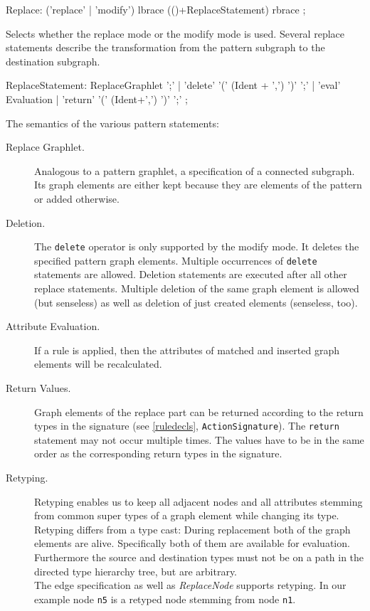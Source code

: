 \begin{rail}
  Replace: ('replace' | 'modify') lbrace (()+ReplaceStatement) rbrace ;
\end{rail}
Selects whether the replace mode or the modify mode is used. Several replace statements describe the transformation from the pattern subgraph to the destination subgraph.

\begin{rail}  
  ReplaceStatement: ReplaceGraphlet ';' |
    'delete' '(' (Ident + ',') ')' ';' |
    'eval' Evaluation |
    'return' '(' (Ident+',') ')' ';' ;
\end{rail}    
The semantics of the various pattern statements:
\begin{description}
  \item[Replace Graphlet.] Analogous to a pattern graphlet, a specification of a connected subgraph. Its graph elements are either kept because they are elements of the pattern or added otherwise.
  \item[Deletion.] The \texttt{delete} operator is only supported by the modify mode. It deletes the specified pattern graph elements. Multiple occurrences of \texttt{delete} statements are allowed. Deletion statements are executed after all other replace statements. Multiple deletion of the same graph element is allowed (but senseless) as well as deletion of just created elements (senseless, too).
  \item[Attribute Evaluation.] If a rule is applied, then the attributes of matched and inserted graph elements will be recalculated.
  \item[Return Values.] Graph elements of the replace part can be returned according to the return types in the signature (see \ref{ruledecls}, \texttt{ActionSignature}). The \texttt{return} statement may not occur multiple times. The values have to be in the same order as the corresponding return types in the signature.
  \item[Retyping.] Retyping enables us to keep all adjacent nodes and all attributes stemming from common super types of a graph element while changing its type. Retyping differs from a type cast: During replacement both of the graph elements are alive. Specifically both of them are available for evaluation. Furthermore the source and destination types must not be on a path in the directed type hierarchy tree, but are arbitrary.\\
The edge specification as well as \emph{ReplaceNode} supports retyping. In our example node \texttt{n5} is a retyped node stemming from node \texttt{n1}.
\end{description}    
    
